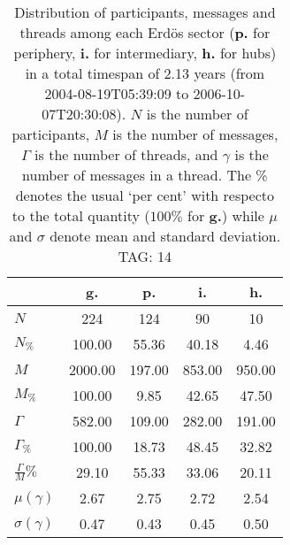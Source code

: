 \begin{table}[h!]
\begin{center}
\begin{tabular}{| l | c | c | c | c |}\hline
 & g. & p. & i. & h. \\\hline
$N$ & 224  & 124  & 90  & 10 \\\hline
$N_{\%}$ & 100.00  & 55.36  & 40.18  & 4.46 \\\hline
$M$ & 2000.00  & 197.00  & 853.00  & 950.00 \\\hline
$M_{\%}$ & 100.00  & 9.85  & 42.65  & 47.50 \\\hline
$\Gamma$ & 582.00  & 109.00  & 282.00  & 191.00 \\\hline
$\Gamma_{\%}$ & 100.00  & 18.73  & 48.45  & 32.82 \\\hline
$\frac{\Gamma}{M}\%$ & 29.10  & 55.33  & 33.06  & 20.11 \\\hline
$\mu(\gamma)$ & 2.67  & 2.75  & 2.72  & 2.54 \\\hline
$\sigma(\gamma)$ & 0.47  & 0.43  & 0.45  & 0.50 \\\hline
\end{tabular}
\caption{Distribution of participants, messages and threads among each Erd\"os sector ({\bf p.} for periphery, {\bf i.} for intermediary, 
    {\bf h.} for hubs) in a total timespan of 2.13 years (from 2004-08-19T05:39:09 to 2006-10-07T20:30:08). $N$ is the number of participants, $M$ is the number of messages, $\Gamma$ is the number of threads, and $\gamma$ is the number of messages in a thread.
    The \% denotes the usual `per cent' with respecto to the total quantity ($100\%$ for {\bf g.})
    while $\mu$ and $\sigma$ denote mean and standard deviation. TAG: 14}
\end{center}
\end{table}